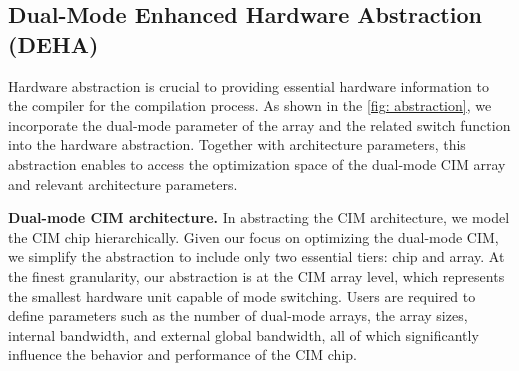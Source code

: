\subsection{Dual-Mode Enhanced Hardware Abstraction (DEHA)}
Hardware abstraction is crucial to providing essential hardware information to the compiler for the compilation process.
As shown in the \fig \ref{fig: abstraction}, we incorporate the dual-mode parameter of the array and the related switch function into the hardware abstraction. Together with architecture parameters, this abstraction enables \name to access the optimization space of the dual-mode CIM array and relevant architecture parameters.


\noindent
\textbf{Dual-mode CIM architecture.} 
In abstracting the CIM architecture, we model the CIM chip hierarchically. Given our focus on optimizing the dual-mode CIM, we simplify the abstraction to include only two essential tiers: chip and array.
At the finest granularity, our abstraction is at the CIM array level, which represents the smallest hardware unit capable of mode switching.  
Users are required to define parameters such as the number of dual-mode arrays, the array sizes, internal bandwidth, and external global bandwidth, all of which significantly influence the behavior and performance of the CIM chip.
\begin{comment}
For the CIM architecture abstraction, we abstract the CIM processor into a hierarchical architecture. 
Meanwhile, since we focus on optimization for the dual-mode CIM chip, we simplify the abstraction, retaining only two necessary abstraction tiers, chip and array.
The finest granularity of abstraction is at the CIM array level, as this represents the minimum hardware granularity for mode switching. Users need to define parameters such as the number of switchable arrays, their sizes, internal bandwidth, and external global bandwidth information, all of which impact the behavior of the CIM chip.
\end{comment}


